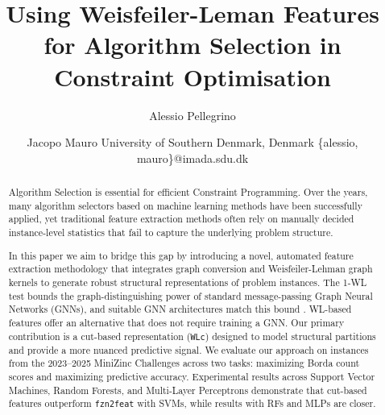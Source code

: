 \documentclass{article}
\title{Using Weisfeiler-Leman Features for Algorithm Selection in Constraint Optimisation}
\author{
    Alessio Pellegrino\and
    Jacopo Mauro
    \affiliations
    University of Southern Denmark, Denmark
    \emails
    \{alessio, mauro\}@imada.sdu.dk
}
\begin{document}
\maketitle

\linenumbers

\begin{abstract}
Algorithm Selection is essential for efficient Constraint Programming. Over the years, many algorithm selectors based on machine learning methods have been successfully applied, yet traditional feature extraction methods often rely on manually decided instance-level statistics that fail to capture the underlying problem structure.

In this paper we aim to bridge this gap by introducing a novel, automated feature extraction methodology that integrates graph conversion and Weisfeiler-Lehman graph kernels to generate robust structural representations of problem instances. The 1-WL test bounds the graph-distinguishing power of standard message-passing Graph Neural Networks (GNNs), and suitable GNN architectures match this bound \citep{Xuetal2018}. WL-based features offer an alternative that does not require training a GNN. Our primary contribution is a cut-based representation (\texttt{WLc}) designed to model structural partitions and provide a more nuanced predictive signal. We evaluate our approach on instances from the 2023--2025 MiniZinc Challenges across two tasks: maximizing Borda count scores and maximizing predictive accuracy. Experimental results across Support Vector Machines, Random Forests, and Multi-Layer Perceptrons demonstrate that cut-based features outperform \texttt{fzn2feat} with SVMs, while results with RFs and MLPs are closer.
\end{abstract}












\newpage


\end{document}
